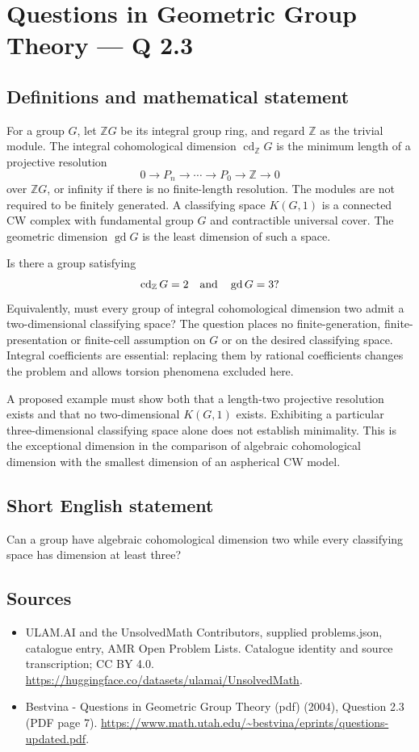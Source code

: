 \documentclass[11pt,a4paper]{article}
\begin{document}
\section*{Questions in Geometric Group Theory — Q 2.3}\label{statement}

\subsection{Definitions and mathematical statement}
For a group $G$, let $\mathbb ZG$ be its integral group ring, and regard $\mathbb Z$ as the trivial module. The integral cohomological dimension $\operatorname{cd}_{\mathbb Z}G$ is the minimum length of a projective resolution
\[
 0\longrightarrow P_n\longrightarrow\cdots\longrightarrow P_0
 \longrightarrow\mathbb Z\longrightarrow0
\]
over $\mathbb ZG$, or infinity if there is no finite-length resolution. The modules are not required to be finitely generated. A classifying space $K(G,1)$ is a connected CW complex with fundamental group $G$ and contractible universal cover. The geometric dimension $\operatorname{gd}G$ is the least dimension of such a space.

Is there a group satisfying
\[
 \operatorname{cd}_{\mathbb Z}G=2\quad\hbox{and}\quad
 \operatorname{gd}G=3?
\]
Equivalently, must every group of integral cohomological dimension two admit a two-dimensional classifying space? The question places no finite-generation, finite-presentation or finite-cell assumption on $G$ or on the desired classifying space. Integral coefficients are essential: replacing them by rational coefficients changes the problem and allows torsion phenomena excluded here.

A proposed example must show both that a length-two projective resolution exists and that no two-dimensional $K(G,1)$ exists. Exhibiting a particular three-dimensional classifying space alone does not establish minimality. This is the exceptional dimension in the comparison of algebraic cohomological dimension with the smallest dimension of an aspherical CW model.
\subsection{Short English statement}
Can a group have algebraic cohomological dimension two while every classifying space has dimension at least three?
\subsection{Sources}
\begin{itemize}
\item[S1] ULAM.AI and the UnsolvedMath Contributors, supplied problems.json, catalogue entry, AMR Open Problem Lists. Catalogue identity and source transcription; CC BY 4.0.
\url{https://huggingface.co/datasets/ulamai/UnsolvedMath}.
\item[S2] Bestvina - Questions in Geometric Group Theory (pdf) (2004), Question 2.3 (PDF page 7). 
\url{https://www.math.utah.edu/~bestvina/eprints/questions-updated.pdf}.
\end{itemize}
\end{document}
